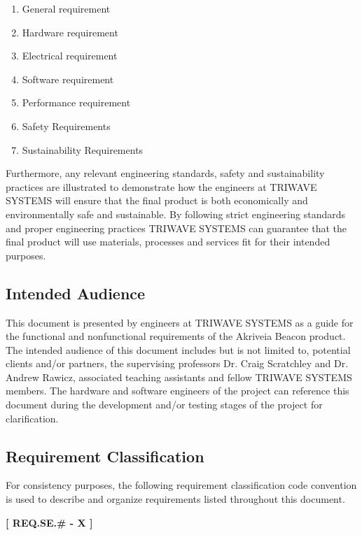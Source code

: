 \begin{enumerate}
\setlength\itemsep{0.25em}
	\item General requirement 
	\item Hardware requirement 
	\item Electrical requirement 
	\item Software requirement 
	\item Performance requirement 
	\item Safety Requirements
	\item Sustainability  Requirements
\end{enumerate}
\medskip
Furthermore, any relevant engineering standards, safety and sustainability practices are illustrated to demonstrate how the engineers at TRIWAVE SYSTEMS will ensure that the final product is both economically and environmentally safe and sustainable. By following strict engineering standards and proper engineering practices TRIWAVE SYSTEMS can guarantee that the final product will use materials, processes and services fit for their intended purposes.

\bigskip
\subsection{Intended Audience}
This document is presented by engineers at TRIWAVE SYSTEMS as a guide for the functional and nonfunctional requirements of the Akriveia Beacon product. The intended audience of this document includes but is not limited to, potential clients and/or partners, the supervising professors Dr. Craig Scratchley and Dr. Andrew Rawicz, associated teaching assistants and fellow TRIWAVE SYSTEMS members. The hardware and software engineers of the project can reference this document during the development and/or testing stages of the project for clarification.

\break

\subsection{Requirement Classification}
For consistency purposes, the following requirement classification code convention is used to describe and organize requirements listed throughout this document. 
\medskip
\begin{center}
	\textbf{[ REQ.SE.\# - X ]} 
\end{center}

